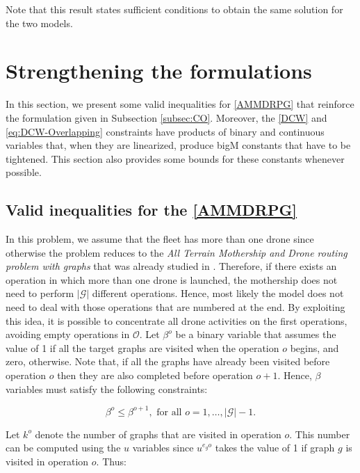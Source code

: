 \documentclass[10pt,a4paper]{elsarticle}
\newcommand{\EN}[1]{{\color{black}#1}}
\begin{document}
\noindent
Note that this result states sufficient conditions to obtain the same solution for the two models.



\color{black}

\section{Strengthening the formulations}\label{bounds}
\noindent
In this section, we present some valid inequalities for \eqref{AMMDRPG} that reinforce the formulation given in Subsection \ref{subsec:CO}. Moreover, the \eqref{DCW} and \eqref{eq:DCW-Overlapping} constraints have products of binary and continuous variables that, when they are linearized, produce bigM constants that have to be tightened. This section also provides some bounds for these constants whenever possible. 



\subsection{Valid inequalities for the \ref{AMMDRPG}}
\noindent
In this problem, we assume that the fleet has more than one drone since otherwise the problem reduces to the \textit{All Terrain Mothership and Drone routing problem with graphs} that was already studied in \cite{art:Amorosi2021}. Therefore, if there exists {an operation} in which more than one drone is launched, the mothership does not need to perform $|\mathcal G|$ different operations. Hence, most likely the model does not need to deal with those operations that are numbered at the end. By exploiting this idea, it is possible to concentrate all drone activities on the first operations, avoiding empty operations in $\mathcal{O}$.
\noindent
Let $\beta^o$ be a binary variable that assumes the value \EN{of} 1 if all the target graphs are visited when the operation $o$ begins, and zero, otherwise. Note that, if all the graphs \EN{have already been} visited before operation $o$ then they are also completed before operation $o+1$. Hence, $\beta$ variables must satisfy the following constraints:

\begin{equation}\tag{Monotonicity}\label{eq:Monotonicity}
\beta^o \leq \beta^{o+1}, \mbox{ for all } o=1,\ldots, |\mathcal{G}|-1.
\end{equation}

\noindent
Let $k^o$ denote the number of graphs that are visited in operation $o$. This number can be computed using the $u$ variables since $u^{e_go}$ takes the value \EN{of} 1 if graph $g$ is visited in operation $o$. Thus:
\end{document}
